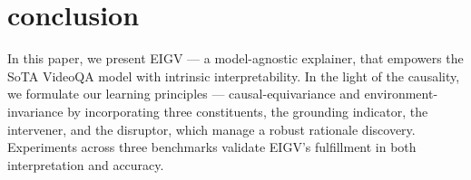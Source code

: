 \section{conclusion}
\label{sec:conclusion}
In this paper, we present EIGV --- a model-agnostic explainer, that empowers the SoTA VideoQA model with intrinsic interpretability. In the light of the causality, we formulate our learning principles --- causal-equivariance and environment-invariance by incorporating three constituents, the grounding indicator, the intervener, and the disruptor, which manage a robust rationale discovery. Experiments across three benchmarks validate EIGV's fulfillment in both interpretation and accuracy.

